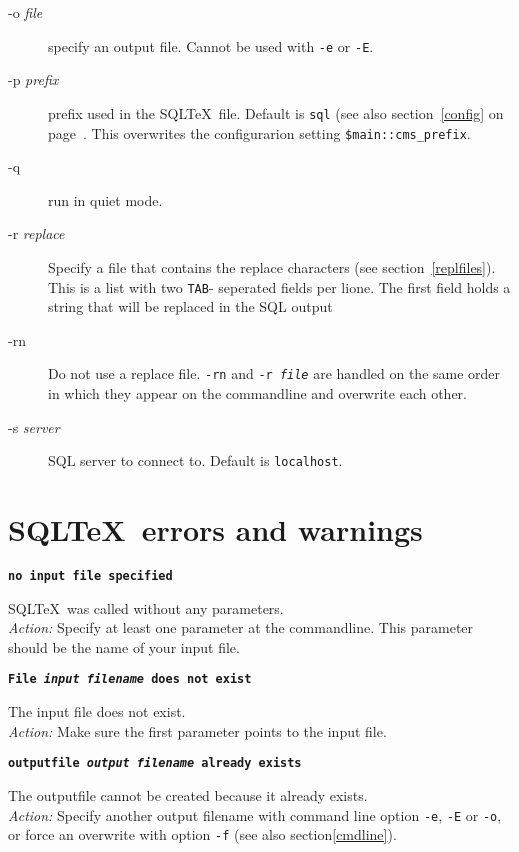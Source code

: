 \documentclass{article}
\newcommand{\vs}{\vspace{3mm}}
\begin{document}
\begin{description}
\item[-o \textit{file}] specify an output file. Cannot be used with \texttt{-e} or \texttt{-E}.
\item[-p \textit{prefix}] prefix used in the SQL\TeX\ file. Default is \texttt{sql} (see also section~\ref{config}
on page~\pageref{prefix}. This overwrites the configurarion setting \texttt{\$main::cms\_prefix}.
\item[-q] run in quiet mode.
\item[-r \textit{replace}] Specify a file that contains the replace characters (see section~\ref{replfiles}). This is
a list with two \texttt{TAB}- seperated fields per lione. The first field holds a string that will be replaced in the SQL output 
\item[-rn] Do not use a replace file. \texttt{-rn} and \texttt{-r \textit{file}} are handled on the same order in which they appear
on the commandline and overwrite each other.
\item[-s \textit{server}] SQL server to connect to. Default is \texttt{localhost}.
\end{description}


\section{SQL\TeX\ errors and warnings}

\noindent\textbf{\texttt{no input file specified}}

\vspace{1mm}

\noindent SQL\TeX\ was called without any parameters.\\
\textit{Action:} Specify at least one parameter at the commandline. This parameter should be
the name of your input file.

\vs

\noindent\textbf{\texttt{File \textit{input filename} does not exist}}

\vspace{1mm}

\noindent The input file does not exist.\\
\textit{Action:} Make sure the first parameter points to the input file.

\vs

\noindent\textbf{\texttt{outputfile \textit{output filename} already exists}}

\vspace{1mm}

\noindent The outputfile cannot be created because it already exists.\\
\textit{Action:} Specify another output filename with command line option \texttt{-e},
\texttt{-E} or \texttt{-o}, or force an overwrite with option \texttt{-f} (see also section\ref{cmdline}).
\end{document}

